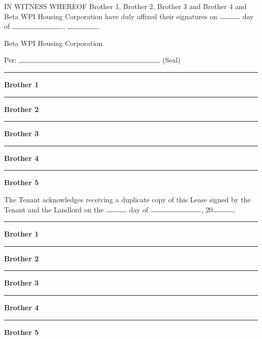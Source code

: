 \documentclass[12pt]{article}
\newcommand\signature[1]{%
\begin{minipage}{5cm}
\noindent
    \noindent\vspace{2cm}\par
    \noindent\rule{5cm}{1pt}\par
    \noindent\textbf{#1}\par
    \end{minipage}}
\begin{document}
\clearpage

IN WITNESS WHEREOF Brother 1, Brother 2, Brother 3 and Brother 4 and Beta WPI
Housing Corporation have duly affixed their signatures on $\rule{1cm}{0.15mm}$
day of $\rule{2.5cm}{0.15mm}$, $\rule{1.5cm}{0.15mm}$.
  	

\begin{flushright} Beta WPI Housing Corporation

\vspace{1cm}

Per: $\rule{7cm}{0.15mm}$ (Seal)
  	

\signature{Brother 1}

\signature{Brother 2}

\signature{Brother 3}

\signature{Brother 4}

\signature{Brother 5} \end{flushright}

\clearpage

The Tenant acknowledges receiving a duplicate copy of this Lease signed by the
Tenant and the Landlord on the $\rule{1cm}{0.15mm}$ day of
$\rule{2.5cm}{0.15mm}$, 20$\rule{1cm}{0.15mm}$.
  	
\begin{flushright}

\signature{Brother 1}

\signature{Brother 2}

\signature{Brother 3}

\signature{Brother 4}

\signature{Brother 5}

\end{flushright} 
\end{document}
